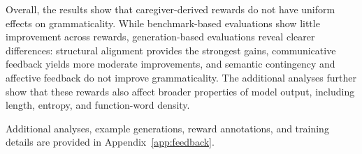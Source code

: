 Overall, the results show that caregiver-derived rewards do not have uniform effects on grammaticality. While benchmark-based evaluations show little improvement across rewards, generation-based evaluations reveal clearer differences: structural alignment provides the strongest gains, communicative feedback yields more moderate improvements, and semantic contingency and affective feedback do not improve grammaticality. The additional analyses further show that these rewards also affect broader properties of model output, including length, entropy, and function-word density.


\fi

Additional analyses, example generations, reward annotations, and training details are provided in Appendix~\ref{app:feedback}.
